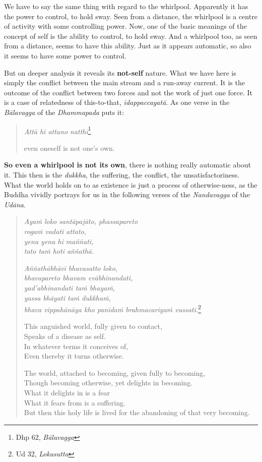 We have to say the same thing with regard to the whirlpool. Apparently it has the power to control, to hold sway. Seen from a distance, the whirlpool is a centre of activity with some controlling power. Now, one of the basic meanings of the concept of self is the ability to control, to hold sway. And a whirlpool too, as seen from a distance, seems to have this ability. Just as it appears automatic, so also it seems to have some power to control.

But on deeper analysis it reveals its \textbf{not-self} nature. What we have here is simply the conflict between the main stream and a run-away current. It is the outcome of the conflict between two forces and not the work of just one force. It is a case of relatedness of this-to-that, \emph{idappaccayatā}. As one verse in the \emph{Bālavagga} of the \emph{Dhammapada} puts it:

\begin{quote}
\emph{Attā hi attano natthi}\footnote{Dhp 62, \emph{Bālavagga}}

even oneself is not one's own.
\end{quote}

\textbf{So even a whirlpool is not its own}, there is nothing really automatic about it. This then is the \emph{dukkha}, the suffering, the conflict, the unsatisfactoriness. What the world holds on to as existence is just a process of otherwise-ness, as the Buddha vividly portrays for us in the following verses of the \emph{Nandavagga} of the \emph{Udāna}.

\enlargethispage{\baselineskip}

\begin{quote}
\emph{Ayaṁ loko santāpajāto, phassapareto}\\
\emph{rogaṁ vadati attato,}\\
\emph{yena yena hi maññati,}\\
\emph{tato taṁ hoti aññathā.}

\emph{Aññathābhāvī bhavasatto loko,}\\
\emph{bhavapareto bhavam evābhinandati,}\\
\emph{yad'abhinandati taṁ bhayaṁ,}\\
\emph{yassa bhāyati taṁ dukkhaṁ,}\\
\emph{bhava vippahānāya kho panidaṁ brahmacariyaṁ vussati.}\footnote{Ud 32, \emph{Lokasutta}}

This anguished world, fully given to contact,\\
Speaks of a disease as self.\\
In whatever terms it conceives of,\\
Even thereby it turns otherwise.

The world, attached to becoming, given fully to becoming,\\
Though becoming otherwise, yet delights in becoming.\\
What it delights in is a fear\\
What it fears from is a suffering.\\
But then this holy life is lived for the abandoning of that very becoming.
\end{quote}

